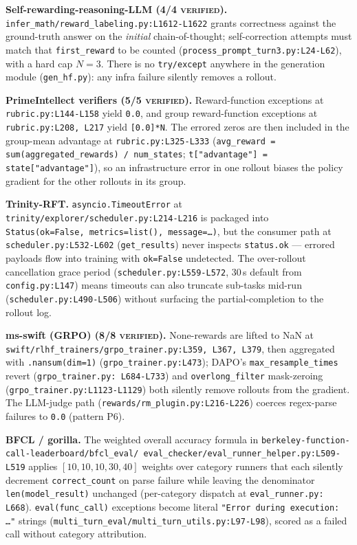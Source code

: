 \documentclass{article}
\begin{document}
\textbf{Self-rewarding-reasoning-LLM (4/4
\textsc{verified}).}
\texttt{infer\_math/}\allowbreak\texttt{reward\_labeling.py:L1612-L1622} grants
correctness against the ground-truth answer on the
\emph{initial} chain-of-thought; self-correction attempts must
match that \texttt{first\_reward} to be counted
(\texttt{process\_prompt\_turn3.py:L24-L62}), with a hard cap
$N=3$. There is no \texttt{try/except} anywhere in the
generation module (\texttt{gen\_hf.py}): any infra failure
silently removes a rollout.

\textbf{PrimeIntellect verifiers (5/5
\textsc{verified}).} Reward-function exceptions at
\texttt{rubric.py:L144-L158} yield \texttt{0.0}, and group
reward-function exceptions at \texttt{rubric.py:L208,~L217}
yield \texttt{[0.0]*N}. The errored zeros are then included in
the group-mean advantage at \texttt{rubric.py:L325-L333}
(\texttt{avg\_reward = sum(aggregated\_rewards) / num\_states};
\texttt{t["advantage"] = state["advantage"]}), so an
infrastructure error in one rollout biases the policy gradient
for the other rollouts in its group.

\textbf{Trinity-RFT.}
\texttt{asyncio.TimeoutError} at
\texttt{trinity/explorer/scheduler.py:L214-L216} is packaged
into \texttt{Status(ok=False,~metrics=list(),~message=\ldots)},
but the consumer path at \texttt{scheduler.py:L532-L602}
(\texttt{get\_results}) never inspects \texttt{status.ok} ---
errored payloads flow into training with \texttt{ok=False}
undetected. The over-rollout cancellation grace period
(\texttt{scheduler.py:L559-L572}, 30\,s default from
\texttt{config.py:L147}) means timeouts can also truncate
sub-tasks mid-run (\texttt{scheduler.py:L490-L506}) without
surfacing the partial-completion to the rollout log.

\textbf{ms-swift (GRPO) (8/8 \textsc{verified}).}
None-rewards are lifted to NaN at
\texttt{swift/rlhf\_trainers/grpo\_trainer.py:L359, L367,
L379}, then aggregated with \texttt{.nansum(dim=1)}
(\texttt{grpo\_trainer.py:L473}); DAPO's
\texttt{max\_resample\_times} revert (\texttt{grpo\_trainer.py:%
L684-L733}) and \texttt{overlong\_filter} mask-zeroing
(\texttt{grpo\_trainer.py:L1123-L1129}) both silently remove
rollouts from the gradient. The LLM-judge path
(\texttt{rewards/rm\_plugin.py:L216-L226}) coerces regex-parse
failures to \texttt{0.0} (pattern P6).

\textbf{BFCL / gorilla.} The weighted overall
accuracy formula in
\texttt{berkeley-function-call-leaderboard/bfcl\_eval/%
eval\_checker/eval\_runner\_helper.py:L509-L519} applies
$[10,10,10,30,40]$ weights over category runners that each
silently decrement \texttt{correct\_count} on parse failure
while leaving the denominator \texttt{len(model\_result)}
unchanged (per-category dispatch at \texttt{eval\_runner.py:%
L668}). \texttt{eval(func\_call)} exceptions become literal
\texttt{"Error during execution: \ldots"} strings
(\texttt{multi\_turn\_eval/multi\_turn\_utils.py:L97-L98}),
scored as a failed call without category attribution.
\end{document}
